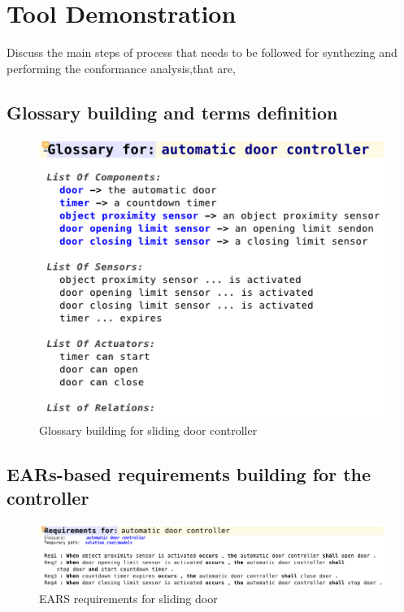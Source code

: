\section{Tool Demonstration}
\label{sec:demo}

Discuss the main steps of process that needs to be followed for synthezing
and performing the conformance analysis,that are, 

\subsection{Glossary building and terms definition}

\begin{figure}[!h]
\centering
\includegraphics[width=1\textwidth]{./images/glossary.png}
\caption{Glossary building for sliding door controller}
\label{fig:glossary_def}
\end{figure}

\subsection{EARs-based requirements building for the controller}

\begin{figure}[!h]
\centering
\includegraphics[width=1\textwidth]{./images/EARS-Reqs.png}
\caption{EARS requirements for sliding door}
\label{fig:EARS_req}
\end{figure}


